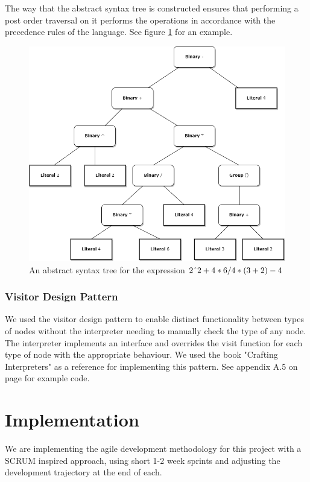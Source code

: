 \documentclass[a4paper, oneside, 11pt]{report}
\begin{document}
The way that the abstract syntax tree is constructed ensures that performing a post order traversal on it performs 
the operations in accordance with the precedence rules of the language. See figure \ref{fig:AST} for an example.
	\begin{figure}[htb]
		\includegraphics[width=1.0 \columnwidth]{AST.png}
		\caption{An abstract syntax tree for  the expression $2 \string^ 2 + 4 * 6 / 4 * (3+2) -4$}
		\label{fig:AST}
	\end{figure}

\newpage
\subsection{Visitor Design Pattern}

We used the visitor design pattern to enable distinct functionality between types of nodes
without the interpreter needing to manually check the type of any node.
The interpreter implements an interface and overrides the visit function for each type of node with 
the appropriate behaviour. We used the book "Crafting Interpreters" \cite{nystrom:2021} as a reference for 
implementing this pattern.
See appendix A.5 on page \pageref{lst:visitor} for example code.

\chapter{Implementation}\label{Impl}

We are implementing the agile development methodology for this project with a SCRUM inspired approach, using short 1-2 week sprints and adjusting the development trajectory at the end of each.
\end{document}
